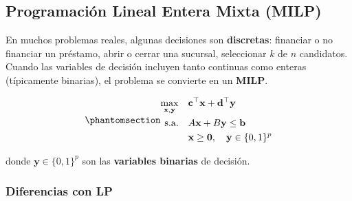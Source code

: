 \documentclass[
  spanish,
  11pt,
  letterpaper,
]{scrbook}
\theoremstyle{plain}
\theoremstyle{remark}
\begin{document}
\subsection{Programación Lineal Entera Mixta (MILP)}\label{sec-milp}

En muchos problemas reales, algunas decisiones son \textbf{discretas}:
financiar o no financiar un préstamo, abrir o cerrar una sucursal,
seleccionar \(k\) de \(n\) candidatos. Cuando las variables de decisión
incluyen tanto continuas como enteras (típicamente binarias), el
problema se convierte en un \textbf{MILP}.

\begin{equation}\protect\phantomsection\label{eq-milp}{
\begin{aligned}
\max_{\mathbf{x}, \mathbf{y}} \quad & \mathbf{c}^\top \mathbf{x} + \mathbf{d}^\top \mathbf{y} \\
\text{s.a.} \quad & A\mathbf{x} + B\mathbf{y} \leq \mathbf{b} \\
& \mathbf{x} \geq \mathbf{0}, \quad \mathbf{y} \in \{0, 1\}^p
\end{aligned}
}\end{equation}

donde \(\mathbf{y} \in \{0, 1\}^p\) son las \textbf{variables binarias}
de decisión.

\subsubsection{Diferencias con LP}\label{diferencias-con-lp}
\end{document}
